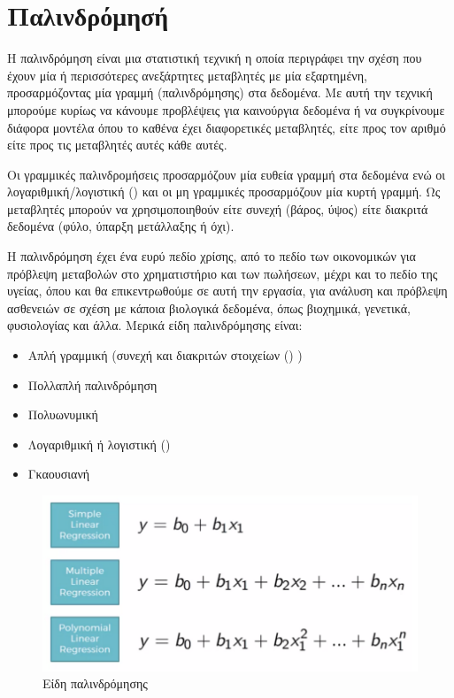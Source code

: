 \newpage
\section{Παλινδρόμησή}
Η παλινδρόμηση είναι μια στατιστική τεχνική η οποία περιγράφει την σχέση που έχουν μία ή
περισσότερες ανεξάρτητες μεταβλητές με μία εξαρτημένη, προσαρμόζοντας μία γραμμή
(παλινδρόμησης) στα δεδομένα. Με αυτή την τεχνική μπορούμε κυρίως να κάνουμε
προβλέψεις για καινούργια δεδομένα ή να συγκρίνουμε διάφορα μοντέλα όπου το καθένα
έχει διαφορετικές μεταβλητές, είτε προς τον αριθμό είτε προς τις μεταβλητές αυτές κάθε
αυτές.

Οι γραμμικές παλινδρομήσεις προσαρμόζουν μία ευθεία γραμμή στα δεδομένα ενώ
οι λογαριθμική/λογιστική () και οι μη γραμμικές προσαρμόζουν μία κυρτή γραμμή. Ως
μεταβλητές μπορούν να χρησιμοποιηθούν είτε συνεχή (βάρος, ύψος) είτε διακριτά δεδομένα
(φύλο, ύπαρξη μετάλλαξης ή όχι).

Η παλινδρόμηση έχει ένα ευρύ πεδίο χρίσης, από το πεδίο
των οικονομικών για πρόβλεψη μεταβολών στο χρηματιστήριο και των πωλήσεων, μέχρι και
το πεδίο της υγείας, όπου και θα επικεντρωθούμε σε αυτή την εργασία, για ανάλυση και
πρόβλεψη ασθενειών σε σχέση με κάποια βιολογικά δεδομένα, όπως βιοχημικά, γενετικά,
φυσιολογίας και άλλα. Μερικά είδη παλινδρόμησης είναι:
\begin{itemize}
    \item Απλή γραμμική (συνεχή και διακριτών στοιχείων () )
    \item Πολλαπλή παλινδρόμηση
    \item Πολυωνυμική
    \item Λογαριθμική ή λογιστική ()
    \item Γκαουσιανή
\end{itemize}

\begin{figure}[H]
    \centering
    \includegraphics[width=1\textwidth]{images/Regression.png}
    \caption{Είδη παλινδρόμησης}
\end{figure}
